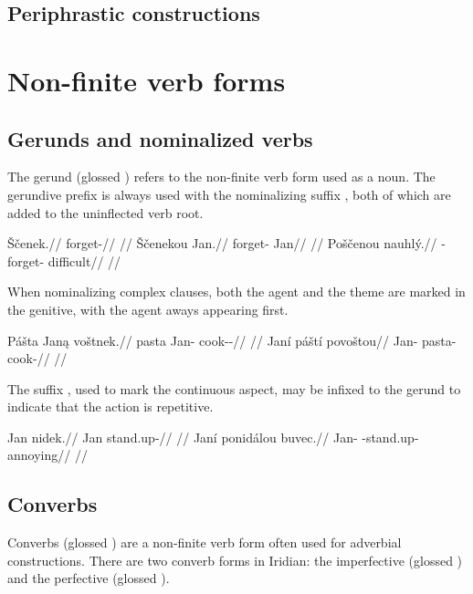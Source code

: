 \subsection{Periphrastic constructions}


\section{Non-finite verb forms}

\subsection{Gerunds and nominalized verbs}
\par The gerund (glossed ) refers to the non-finite verb form used as a noun. The gerundive prefix  is always used with the nominalizing suffix , both of which are added to the uninflected verb root.

\pex
\a
\begingl
\gla Ščenek.//
\glb forget-//
\glft {}//
\endgl
\a
\begingl
\gla Ščenekou Jan.//
\glb forget- Jan//
\glft {}//
\endgl
\a
\begingl
\gla Poščenou nauhl\'y.//
\glb {}-forget- difficult//
\glft {}//
\endgl
\xe

When nominalizing complex clauses, both the agent and the theme are marked in the genitive, with the agent aways appearing first.

\pex
\a
\begingl
\gla Pášta Jan\k{a} voštnek.//
\glb pasta Jan-\Agt{} cook-\Pv{}-\Pf{}//
\glft {}//
\endgl
\a
\begingl
\gla Janí páští povoštou//
\glb Jan-\Gen{} pasta-\Gen{} cook-//
\glft {}//
\endgl
\xe

The suffix , used to mark the continuous aspect, may be infixed to the gerund to indicate that the action is repetitive.

\pex
\a
\begingl
\gla Jan nidek.//
\glb Jan stand.up-//
\glft {}//
\endgl
\a
\begingl
\gla Janí ponidálou buvec.//
\glb Jan-\Gen{} -stand.up- annoying//
\glft {}//
\endgl
\xe

\subsection{Converbs}
Converbs (glossed \Cv{}) are a non-finite verb form often used for adverbial constructions. There are two converb forms in Iridian: the imperfective  (glossed ) and the perfective  (glossed ).

